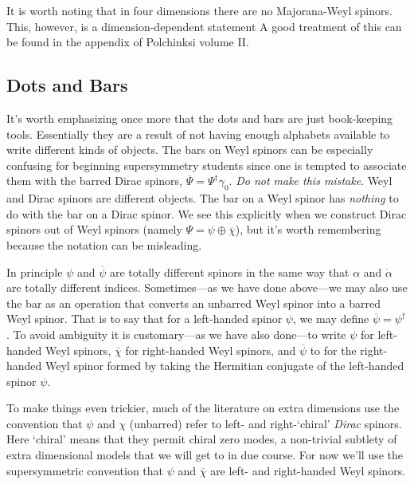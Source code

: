 It is worth noting that in four dimensions there are no Majorana-Weyl spinors. This, however, is a dimension-dependent statement A good treatment of this can be found in the appendix of Polchinksi volume II\autocite{Polchinski:1998rr}.


\subsection{Dots and Bars}

It's worth emphasizing once more that the dots and bars are just book-keeping tools. Essentially they are a result of not having enough alphabets available to write different kinds of objects. The bars on Weyl spinors can be especially confusing for beginning supersymmetry students since one is tempted to associate them with the barred Dirac spinors, $\overline\Psi = \Psi^\dagger \gamma_0$. \emph{Do not make this mistake}. Weyl and Dirac spinors are different objects. The bar on a Weyl spinor has \emph{nothing} to do with the bar on a Dirac spinor. We see this explicitly when we construct Dirac spinors out of Weyl spinors (namely $\Psi = \psi\oplus\overline\chi$), but it's worth remembering because the notation can be misleading. %

In principle $\psi$ and $\overline\psi$ are totally different spinors in the same way that $\alpha$ and $\dot\alpha$ are totally different indices. Sometimes---as we have done above---we may also use the bar as an operation that converts an unbarred Weyl spinor into a barred Weyl spinor. That is to say that for a left-handed spinor $\psi$, we may define $\overline\psi=\psi^\dag$. To avoid ambiguity it is customary---as we have also done---to write $\psi$ for left-handed Weyl spinors, $\overline\chi$ for right-handed Weyl spinors, and $\overline\psi$ to for the right-handed Weyl spinor formed by taking the Hermitian conjugate of the left-handed spinor $\psi$.

To make things even trickier, much of the literature on extra dimensions use the convention that $\psi$ and $\chi$ (unbarred) refer to left- and right-`chiral' \textit{Dirac} spinors. Here `chiral' means that they permit chiral zero modes, a non-trivial subtlety of extra dimensional models that we will get to in due course. For now we'll use the supersymmetric convention that $\psi$ and $\overline\chi$ are left- and right-handed Weyl spinors.




